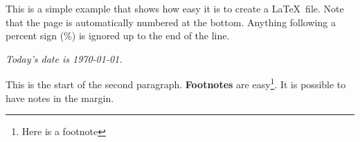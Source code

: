 \documentclass[a4paper, 12pt]{article}
\begin{document}
\begin{sffamily}
\large
This is a simple example that shows how easy it is to create a
\LaTeX\ file.
Note that the page is automatically numbered at the bottom.
Anything following a percent sign (\%) is ignored up to the end of
the line. %
\end{sffamily}

\begin{rmfamily}
\slshape
Today’s date is \today.

This is the start of the second paragraph.
{\bfseries Footnotes} are easy\footnote{Here is a footnote}.
It is possible to have notes in the margin.
\end{rmfamily}
\end{document}
